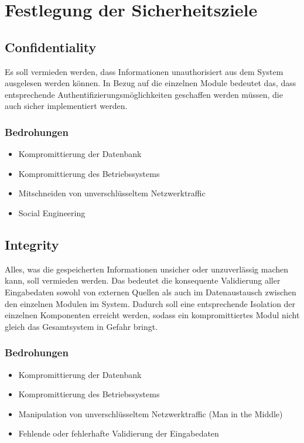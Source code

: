 \documentclass[12pt,a4paper,titlepage,oneside]{scrartcl}
\begin{document}
\maketitle
\setcounter{section}{0}
\setcounter{tocdepth}{2}
\tableofcontents

%
%

\section{Festlegung der Sicherheitsziele}
\subsection{Confidentiality}
Es soll vermieden werden, dass Informationen unauthorisiert aus dem System
ausgelesen werden können. In Bezug auf die einzelnen Module bedeutet das, dass
entsprechende Authentifizierungsmöglichkeiten geschaffen werden müssen, die auch
sicher implementiert werden.

\subsubsection{Bedrohungen}
\begin{itemize}
	\item Kompromittierung der Datenbank
	\item Kompromittierung des Betriebssystems
	\item Mitschneiden von unverschlüsseltem Netzwerktraffic
	\item Social Engineering
\end{itemize}

\subsection{Integrity}
Alles, was die gespeicherten Informationen unsicher oder unzuverlässig machen
kann, soll vermieden werden. Das bedeutet die konsequente Validierung aller
Eingabedaten sowohl von externen Quellen als auch im Datenaustausch zwischen den
einzelnen Modulen im System. Dadurch soll eine entsprechende Isolation der einzelnen
Komponenten erreicht werden, sodass ein kompromittiertes Modul nicht gleich das
Gesamtsystem in Gefahr bringt.

\subsubsection{Bedrohungen}
\begin{itemize}
	\item Kompromittierung der Datenbank
	\item Kompromittierung des Betriebssystems
	\item Manipulation von unverschlüsseltem Netzwerktraffic (Man in the Middle)
	\item Fehlende oder fehlerhafte Validierung der Eingabedaten
\end{itemize}
\end{document}
